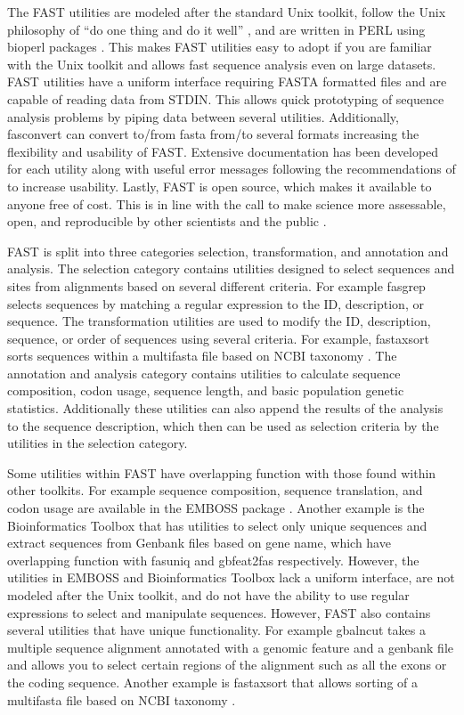 \documentclass{frontiersSCNS} %
\begin{document}
The FAST utilities are modeled after the
standard Unix toolkit\citep{Peek2001}, follow the Unix philosophy of
``do one thing and do it well'' \citep{Stutz2000}, and are written in
PERL using bioperl packages \citep{Stajich2002}. This makes FAST
utilities easy to adopt if you are familiar with the Unix toolkit and
allows fast sequence analysis even on large datasets. FAST utilities
have a uniform interface requiring FASTA formatted files and are
capable of reading data from STDIN. This allows quick prototyping of
sequence analysis problems by piping data between several
utilities. Additionally, fasconvert can convert to/from fasta from/to
several formats increasing the flexibility and usability of
FAST. Extensive documentation has been developed for each utility
along with useful error messages following the recommendations of
\cite{Seemann2013} to increase usability. Lastly, FAST is open source,
which makes it available to anyone free of cost. This is in line with
the call to make science more assessable, open, and reproducible by
other scientists and the public \citep{Groves2012}.  

FAST is split
into three categories selection, transformation, and annotation and
analysis. The selection category contains utilities designed to select
sequences and sites from alignments based on several different
criteria. For example fasgrep selects sequences by matching a regular
expression to the ID, description, or sequence. The transformation
utilities are used to modify the ID, description, sequence, or order
of sequences using several criteria. For example, fastaxsort sorts
sequences within a multifasta file based on NCBI taxonomy
\citep{Benson2009, Sayers2009}. The annotation and analysis category
contains utilities to calculate sequence composition, codon usage,
sequence length, and basic population genetic statistics. Additionally
these utilities can also append the results of the analysis to the
sequence description, which then can be used as selection criteria by
the utilities in the selection category.

Some utilities within FAST
have overlapping function with those found within other toolkits. For
example sequence composition, sequence translation, and codon usage
are available in the EMBOSS package \citep{Rice2000}. Another example
is the Bioinformatics Toolbox \citep{White2014} that has utilities to
select only unique sequences and extract sequences from Genbank files
based on gene name, which have overlapping function with fasuniq and
gbfeat2fas respectively. However, the utilities in EMBOSS
\citep{Rice2000} and Bioinformatics Toolbox \citep{White2014} lack a
uniform interface, are not modeled after the Unix toolkit, and do not
have the ability to use regular expressions to select and manipulate
sequences. However, FAST also contains several utilities that have
unique functionality. For example gbalncut takes a multiple sequence
alignment annotated with a genomic feature and a genbank file and
allows you to select certain regions of the alignment such as all the
exons or the coding sequence. Another example is fastaxsort that
allows sorting of a multifasta file based on NCBI taxonomy
\citep{Benson2009, Sayers2009}.
\end{document}
